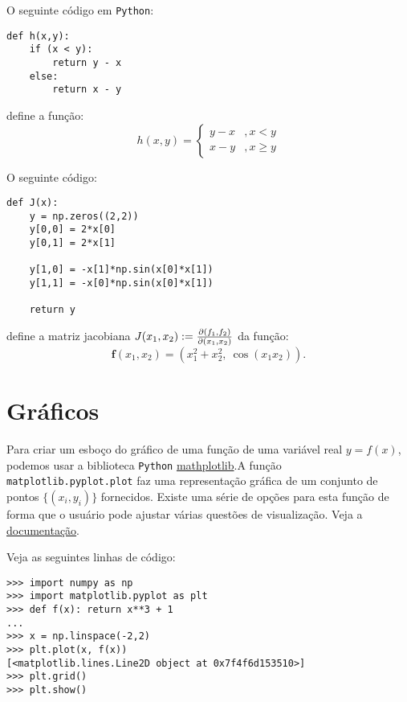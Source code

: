 \begin{ex}
  O seguinte código em \verb+Python+:
\begin{verbatim}
def h(x,y):
    if (x < y):
        return y - x
    else:
        return x - y
\end{verbatim}
define a função:
\begin{equation}
  h(x,y) = \left\{
    \begin{array}{ll}
      y - x &, x < y\\
      x - y &, x \geq y
    \end{array}
\right.
\end{equation}
\end{ex}

\begin{ex}
  O seguinte código:
\begin{verbatim}
def J(x):
    y = np.zeros((2,2))
    y[0,0] = 2*x[0]
    y[0,1] = 2*x[1]

    y[1,0] = -x[1]*np.sin(x[0]*x[1])
    y[1,1] = -x[0]*np.sin(x[0]*x[1])

    return y
\end{verbatim}
define a matriz jacobiana $J(x_1,x_2) := \frac{\partial(f_1,f_2)}{\partial(x_1,x_2)}$ da função:
\begin{equation}
  \pmb{f}(x_1,x_2) = (x_1^2 + x_2^2,~\cos(x_1x_2)).
\end{equation}
\end{ex}

\section{Gráficos}

Para criar um esboço do gráfico de uma função de uma variável real $y = f(x)$, podemos usar a biblioteca \verb+Python+ \href{https://matplotlib.org/}{mathplotlib}.A função \verb+matplotlib.pyplot.plot+ faz uma representação gráfica de um conjunto de pontos $\{(x_i, y_i)\}$ fornecidos. Existe uma série de opções para esta função de forma que o usuário pode ajustar várias questões de visualização. Veja a \href{https://matplotlib.org/api/pyplot_api.html?highlight=pyplot.plot#matplotlib.pyplot.plot}{documentação}.

\begin{ex}
  Veja as seguintes linhas de código:
\begin{verbatim}
>>> import numpy as np
>>> import matplotlib.pyplot as plt
>>> def f(x): return x**3 + 1
...
>>> x = np.linspace(-2,2)
>>> plt.plot(x, f(x))
[<matplotlib.lines.Line2D object at 0x7f4f6d153510>]
>>> plt.grid()
>>> plt.show()
\end{verbatim}
\end{ex}
